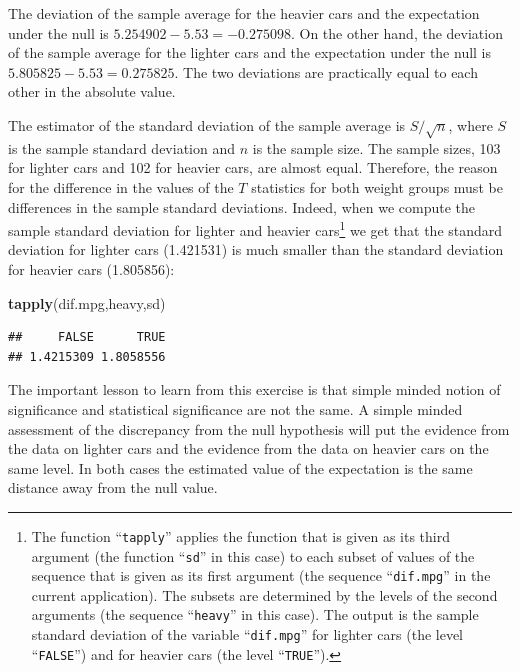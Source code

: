 \documentclass[]{krantz}
\makeatletter
\newenvironment{Shaded}{\begin{snugshade}}{\end{snugshade}}
\newcommand{\KeywordTok}[1]{\textcolor[rgb]{0.13,0.29,0.53}{\textbf{#1}}}
\newcommand{\NormalTok}[1]{#1}
\newenvironment{kframe}{%
\medskip{}
\setlength{\fboxsep}{.8em}
 \def\at@end@of@kframe{}%
 \ifinner\ifhmode%
  \def\at@end@of@kframe{\end{minipage}}%
  \begin{minipage}{\columnwidth}%
 \fi\fi%
 \def\FrameCommand##1{\hskip\@totalleftmargin \hskip-\fboxsep
 \colorbox{shadecolor}{##1}\hskip-\fboxsep
     \hskip-\linewidth \hskip-\@totalleftmargin \hskip\columnwidth}%
 \MakeFramed {\advance\hsize-\width
   \@totalleftmargin\z@ \linewidth\hsize
   \@setminipage}}%
 {\par\unskip\endMakeFramed%
 \at@end@of@kframe}
\renewenvironment{Shaded}{\begin{kframe}}{\end{kframe}}
\theoremstyle{definition}
\theoremstyle{definition}
\theoremstyle{definition}
\theoremstyle{remark}
\makeatother
\begin{document}
The deviation of the sample average for the heavier cars and the
expectation under the null is \(5.254902 - 5.53 = -0.275098\). On the
other hand, the deviation of the sample average for the lighter cars and
the expectation under the null is \(5.805825 - 5.53 = 0.275825\). The two
deviations are practically equal to each other in the absolute value.

The estimator of the standard deviation of the sample average is
\(S/\sqrt{n}\), where \(S\) is the sample standard deviation and \(n\) is the
sample size. The sample sizes, 103 for lighter cars and 102 for heavier
cars, are almost equal. Therefore, the reason for the difference in the
values of the \(T\) statistics for both weight groups must be differences
in the sample standard deviations. Indeed, when we compute the sample
standard deviation for lighter and heavier cars\footnote{The function ``\texttt{tapply}'' applies the function that is given as its
  third argument (the function ``\texttt{sd}'' in this case) to each subset of
  values of the sequence that is given as its first argument (the
  sequence ``\texttt{dif.mpg}'' in the current application). The subsets are
  determined by the levels of the second arguments (the sequence
  ``\texttt{heavy}'' in this case). The output is the sample standard deviation
  of the variable ``\texttt{dif.mpg}'' for lighter cars (the level ``\texttt{FALSE}'')
  and for heavier cars (the level ``\texttt{TRUE}'').} we get that the
standard deviation for lighter cars (1.421531) is much smaller than the
standard deviation for heavier cars (1.805856):

\begin{Shaded}
\begin{Highlighting}[]
\KeywordTok{tapply}\NormalTok{(dif.mpg,heavy,sd)}
\end{Highlighting}
\end{Shaded}

\begin{verbatim}
##     FALSE      TRUE 
## 1.4215309 1.8058556
\end{verbatim}

The important lesson to learn from this exercise is that simple minded
notion of significance and statistical significance are not the same. A
simple minded assessment of the discrepancy from the null hypothesis
will put the evidence from the data on lighter cars and the evidence
from the data on heavier cars on the same level. In both cases the
estimated value of the expectation is the same distance away from the
null value.
\end{document}
